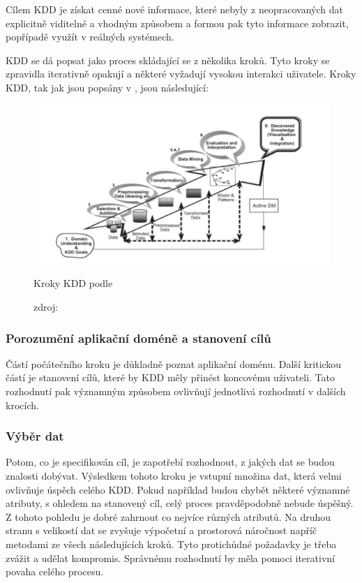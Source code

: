 \documentclass[thesis=M,czech]{FITthesis}[2012/06/26]
\begin{document}
Cílem KDD je získat cenné nové informace, které nebyly z neopracovaných dat explicitně viditelné a vhodným způsobem a formou pak tyto informace zobrazit, popřípadě využít v reálných systémech.~\cite{fayyad}

KDD se dá popsat jako proces skládající se z několika kroků. Tyto kroky se zpravidla iterativně opakují a některé vyžadují vysokou interakci uživatele. Kroky KDD, tak jak jsou popsány v \cite{hbcap}, jsou následující:

\begin{figure}[htbp]
\begin{center}
	\includegraphics[scale=0.75]{kdd_steps}
\caption{Kroky KDD podle \cite{fayyad}}
\end{center}
  \caption*{zdroj: \cite{fayyad}}
\end{figure}

\subsubsection*{Porozumění aplikační doméně a stanovení cílů}
Částí počátečního kroku je důkladně poznat aplikační doménu. Další kritickou částí je stanovení cílů, které by KDD měly přinést koncovému uživateli. Tato rozhodnutí pak významným způsobem ovlivňují jednotlivá rozhodnutí v dalších krocích.
 		
\subsubsection*{Výběr dat}
Potom, co je specifikován cíl, je zapotřebí rozhodnout, z jakých dat se budou znalosti dobývat. 
Výsledkem tohoto kroku je vstupní množina dat, která velmi ovlivňuje úspěch celého KDD. Pokud například budou chybět některé významné atributy, s ohledem na stanovený cíl, celý proces pravděpodobně nebude úspěšný. Z tohoto pohledu je dobré zahrnout co nejvíce různých atributů. Na druhou stranu s velikostí dat se zvyšuje výpočetní a prostorová náročnost napříč metodami ze všech následujících kroků. Tyto protichůdné požadavky je třeba zvážit a udělat kompromis. Správnému rozhodnutí by měla pomoci iterativní povaha celého procesu.
\end{document}

